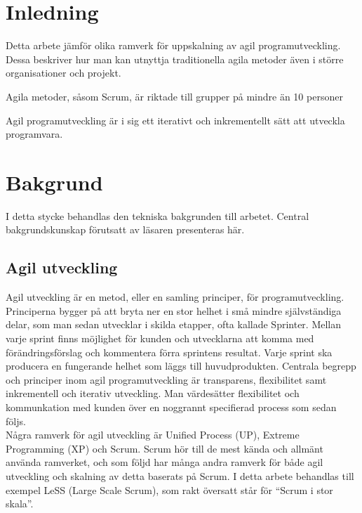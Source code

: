 \section{Inledning}
	
	Detta arbete jämför olika ramverk för uppskalning av agil programutveckling. Dessa beskriver hur man kan utnyttja traditionella agila metoder även i större organisationer och projekt. 
	
	Agila metoder, såsom Scrum, är riktade till grupper på mindre än 10 personer\cite{scrum_guide}	
	
	
	Agil programutveckling är i sig ett iterativt och inkrementellt sätt att utveckla programvara.
	
\newpage
\section{Bakgrund}
	
	I detta stycke behandlas den tekniska bakgrunden till arbetet. Central bakgrundskunskap förutsatt av läsaren presenteras här.
	
	\subsection{Agil utveckling}
	
		Agil utveckling är en metod, eller en samling principer, för programutveckling. Principerna bygger på att bryta ner en stor helhet i små mindre självständiga delar, som man sedan utvecklar i skilda etapper, ofta kallade Sprinter.
		Mellan varje sprint finns möjlighet för kunden och utvecklarna att komma med förändringsförslag och kommentera förra sprintens resultat. Varje sprint ska producera en fungerande helhet som läggs till huvudprodukten. Centrala begrepp och principer inom agil programutveckling är transparens, flexibilitet samt inkrementell och iterativ utveckling. Man värdesätter flexibilitet och kommunkation med kunden över en noggrannt specifierad process som sedan följs. \cite{agile_manifesto}
		\\
		Några ramverk för agil utveckling är Unified Process (UP), Extreme Programming (XP) och Scrum.
		Scrum hör till de mest kända och allmänt använda ramverket, och som följd har många andra ramverk för både agil utveckling och skalning av detta baserats på Scrum. I detta arbete behandlas till exempel LeSS (Large Scale Scrum), som rakt översatt står för ``Scrum i stor skala''.
		
